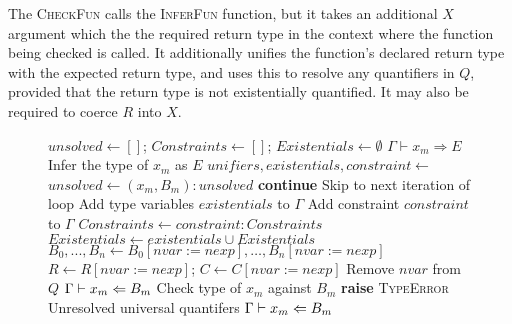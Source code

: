 \noindent The \textsc{CheckFun} calls the \textsc{InferFun} function, but it
takes an additional $X$ argument which the the required return type in
the context where the function being checked is called. It
additionally unifies the function's declared return type with the
expected return type, and uses this to resolve any quantifiers in $Q$,
provided that the return type is not existentially quantified. It may
also be required to coerce $R$ into $X$.

\begin{figure}[p]
\begin{algorithmic}[1]
  \State $\mathit{unsolved}\gets []$;
  $\mathit{Constraints}\gets []$;
  $\mathit{Existentials}\gets \emptyset$
    \State $\Gamma \vdash x_m \Rightarrow E$
    \Comment Infer the type of $x_m$ as $E$
      \State $\mathit{unifiers}, \mathit{existentials}, \mathit{constraint} \gets$ 
        \State $\mathit{unsolved}\gets (x_m,B_m) : \mathit{unsolved}$
        \State \textbf{continue}
        \Comment Skip to next iteration of loop
        \State Add type variables $\mathit{existentials}$ to $\Gamma$
        \State Add constraint $\mathit{constraint}$ to $\Gamma$
        \State $\mathit{Constraints}\gets \mathit{constraint} : \mathit{Constraints}$
        \State $\mathit{Existentials}\gets \mathit{existentials} \cup \mathit{Existentials}$
      \EndIf
        \State $B_0,...,B_n\gets B_0[\mathit{nvar} := \mathit{nexp}],\ldots,B_n[\mathit{nvar} := \mathit{nexp}]$
        \State $R\gets R[\mathit{nvar} := \mathit{nexp}]$;
        $C\gets C[\mathit{nvar} := \mathit{nexp}]$
        \State Remove $\mathit{nvar}$ from $Q$
      \EndFor
      \State $\Gamma \vdash x_m \Leftarrow B_m$
      \Comment Check type of $x_m$ against $B_m$
    \EndIf
  \EndFor
    \State \textbf{raise} \textsc{TypeError}
    \Comment Unresolved universal quantifers
  \EndIf
  \State {}
    $\Gamma \vdash x_m \Leftarrow B_m$
  \EndFor
  \State \Return {}
  \EndFunction\\


\end{algorithmic}
\end{figure}
